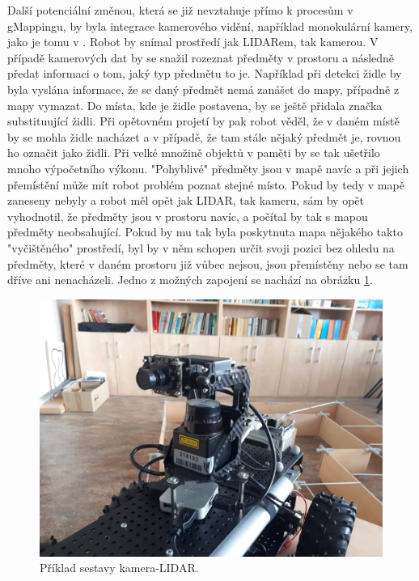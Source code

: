 \documentclass[12pt]{report}
\begin{document}
\indent Další potenciální změnou, která se již nevztahuje přímo k procesům v gMappingu, by byla integrace kamerového vidění, například monokulární kamery, jako je tomu v \cite{Galvez-Lopez2016}. Robot by snímal prostředí jak LIDARem, tak kamerou. V případě kamerových dat by se snažil rozeznat předměty v prostoru a následně předat informaci o tom, jaký typ předmětu to je. Například při detekci židle by byla vyslána informace, že se daný předmět nemá zanášet do mapy, případně z mapy vymazat. Do místa, kde je židle postavena, by se ještě přidala značka substituující židli. Při opětovném projetí by pak robot věděl, že v daném místě by se mohla židle nacházet a v případě, že tam stále nějaký předmět je, rovnou ho označit jako židli. Při velké množině objektů v paměti by se tak ušetřilo mnoho výpočetního výkonu. "Pohyblivé" předměty jsou v mapě navíc a při jejich přemístění může mít robot problém poznat stejné místo. Pokud by tedy v mapě zaneseny nebyly a robot měl opět jak LIDAR, tak kameru, sám by opět vyhodnotil, že předměty jsou v prostoru navíc, a počítal by tak s mapou předměty neobsahující. Pokud by mu tak byla poskytnuta mapa nějakého takto "vyčištěného" prostředí, byl by v něm schopen určit svoji pozici bez ohledu na předměty, které v daném prostoru již vůbec nejsou, jsou přemístěny nebo se tam dříve ani nenacházeli. Jedno z možných zapojení se nachází na obrázku \ref{fig:camera}.

\begin{figure}[t]
	\begin{center}
		\includegraphics[width=0.7\columnwidth]{imgs/camera.jpg}
	\end{center}
	\caption{Příklad sestavy kamera-LIDAR.}
	\label{fig:camera}
\end{figure}


\newpage
\end{document}
